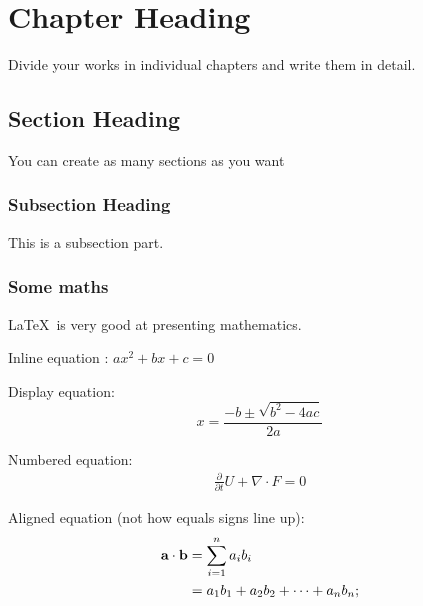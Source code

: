 \chapter{Chapter Heading} %
\label{cha:chapter label} %

Divide your works in individual chapters and write them in detail.

\section{Section Heading} %
\label{sec:section label} %
You can create as many sections as you want

 
\subsection{Subsection Heading} %
\label{sec:subsection label} %
This is a subsection part.

\subsection{Some maths}


\LaTeX\ is very good at presenting mathematics.

Inline equation :
$ax^2 + bx + c = 0$ %

Display equation:
$$x = \frac{-b \pm \sqrt{b^2 - 4ac}}{2a}$$ %

Numbered equation:
\begin{align}
	\label{eq:equation label} %
	\frac{\partial}{\partial t} U + \nabla \cdot F = 0
\end{align}

Aligned equation (not how equals signs line up):
\begin{align}
	\notag %
	\label{eq:dot product}
	\textbf{a} \cdot \textbf{b} &= \sum_{i=1}^n a_ib_i \\
	&= a_1b_1 + a_2b_2 + \cdots + a_nb_n; %
\end{align}

